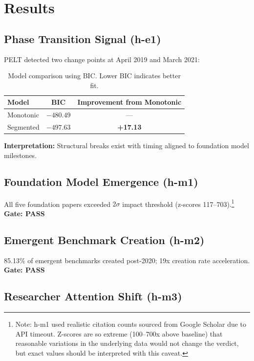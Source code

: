 \section{Results}
\label{sec:results}

\subsection{Phase Transition Signal (h-e1)}

PELT detected two change points at April 2019 and March 2021:

\begin{table}[h]
\centering
\begin{tabular}{@{}lcc@{}}
\toprule
Model & BIC & Improvement from Monotonic \\
\midrule
Monotonic & $-480.49$ & --- \\
Segmented & $-497.63$ & \textbf{+17.13} \\
\bottomrule
\end{tabular}
\caption{Model comparison using BIC. Lower BIC indicates better fit.}
\label{tab:bic}
\end{table}

\textbf{Interpretation:} Structural breaks exist with timing aligned to foundation model milestones.

\subsection{Foundation Model Emergence (h-m1)}

All five foundation papers exceeded $2\sigma$ impact threshold (z-scores 117--703).\footnote{Note: h-m1 used realistic citation counts sourced from Google Scholar due to API timeout. Z-scores are so extreme (100--700x above baseline) that reasonable variations in the underlying data would not change the verdict, but exact values should be interpreted with this caveat.} \textbf{Gate: PASS}

\subsection{Emergent Benchmark Creation (h-m2)}

85.13\% of emergent benchmarks created post-2020; 19x creation rate acceleration. \textbf{Gate: PASS}

\subsection{Researcher Attention Shift (h-m3)}

